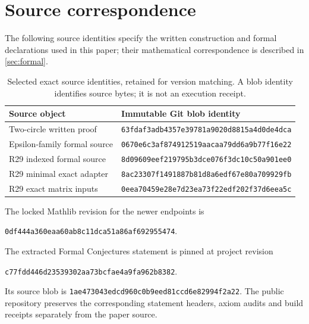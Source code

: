 \section{Source correspondence}\label{app:sources}

The following source identities specify the written construction and
formal declarations used in this paper; their mathematical correspondence
is described in \cref{sec:formal}.

\begin{table}[ht]
\centering\footnotesize
\begin{tabularx}{\textwidth}{@{}p{}X@{}}
\toprule
Source object & Immutable Git blob identity\\\midrule
Two-circle written proof & \texttt{63fdaf3adb4357e39781a9020d8815a4d0de4dca}\\[3pt]
Epsilon-family formal source & \texttt{0670e6c3af874912519aacaa79dd6a9b77f16e22}\\[3pt]
R29 indexed formal source & \texttt{8d09609eef219795b3dce076f3dc10c50a901ee0}\\[3pt]
R29 minimal exact adapter & \texttt{8ac23307f1491887b81d8a6edf67e80a709929fb}\\[3pt]
R29 exact matrix inputs & \texttt{0eea70459e28e7d23ea73f22edf202f37d6eea5c}\\
\bottomrule
\end{tabularx}
\caption{Selected exact source identities, retained for version matching.
A blob identity identifies source bytes; it is not an execution receipt.}
\end{table}

The locked Mathlib revision for the newer endpoints is
\begin{center}\small\texttt{0df444a360eaa60ab8c11dca51a86af692955474}.\end{center}
The extracted Formal Conjectures statement is pinned at project revision
\begin{center}\small\texttt{c77fdd446d23539302aa73bcfae4a9fa962b8382}.\end{center}
Its source blob is \texttt{1ae473043edcd960c0b9eed81ccd6e82994f2a22}.
The public repository preserves the corresponding statement headers,
axiom audits and build receipts separately from the paper source.
